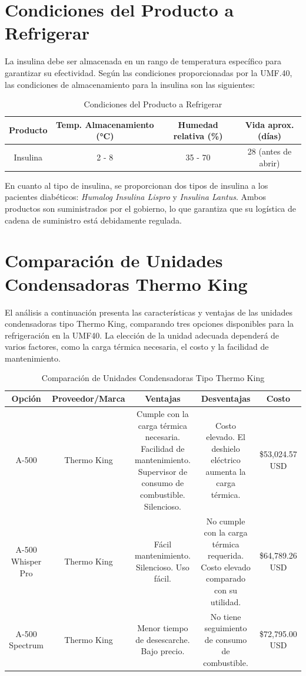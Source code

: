  \section{Condiciones del Producto a Refrigerar}
 La insulina debe ser almacenada en un rango de temperatura específico para garantizar su efectividad. Según las condiciones proporcionadas por la UMF.40, las condiciones de almacenamiento para la insulina son las siguientes:
 
 \begin{table}[h!]
 	\centering
 	\caption{Condiciones del Producto a Refrigerar}
 	\begin{tabular}{|c|c|c|c|}
 		\hline
 		\textbf{Producto} & \textbf{Temp. Almacenamiento (°C)} & \textbf{Humedad relativa (\%)} & \textbf{Vida aprox. (días)} \\ \hline
 		Insulina & 2 - 8 & 35 - 70 & 28 (antes de abrir) \\ \hline
 	\end{tabular}
 \end{table}
 
 En cuanto al tipo de insulina, se proporcionan dos tipos de insulina a los pacientes diabéticos: \textit{Humalog Insulina Lispro} y \textit{Insulina Lantus}. Ambos productos son suministrados por el gobierno, lo que garantiza que su logística de cadena de suministro está debidamente regulada.
 
 
 \section{Comparación de Unidades Condensadoras Thermo King}
 El análisis a continuación presenta las características y ventajas de las unidades condensadoras tipo Thermo King, comparando tres opciones disponibles para la refrigeración en la UMF40. La elección de la unidad adecuada dependerá de varios factores, como la carga térmica necesaria, el costo y la facilidad de mantenimiento.
 
 \begin{table}[h!]
 	\centering
 	\caption{Comparación de Unidades Condensadoras Tipo Thermo King}
 	\begin{tabular}{|c|c|c|c|c|}
 		\hline
 		\textbf{Opción} & \textbf{Proveedor/Marca} & \textbf{Ventajas} & \textbf{Desventajas} & \textbf{Costo} \\ \hline
 		A-500 & Thermo King & Cumple con la carga térmica necesaria. Facilidad de mantenimiento. Supervisor de consumo de combustible. Silencioso. & Costo elevado. El deshielo eléctrico aumenta la carga térmica. & \$53,024.57 USD \\ \hline
 		A-500 Whisper Pro & Thermo King & Fácil mantenimiento. Silencioso. Uso fácil. & No cumple con la carga térmica requerida. Costo elevado comparado con su utilidad. & \$64,789.26 USD \\ \hline
 		A-500 Spectrum & Thermo King & Menor tiempo de desescarche. Bajo precio. & No tiene seguimiento de consumo de combustible. & \$72,795.00 USD \\ \hline
 	\end{tabular}
 \end{table}
 

